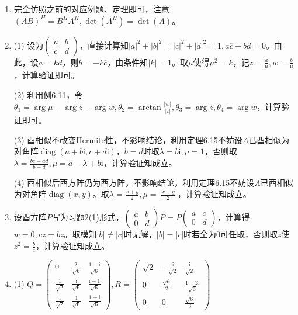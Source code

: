 \documentclass[a4paper,UTF8,fontset=windows]{ctexart}
\DeclareMathOperator{\diag}{diag}
\begin{document}
\begin{enumerate}
\item
完全仿照之前的对应例题、定理即可，注意$(AB)^H=B^HA^H,\det(A^H)=\overline{\det(A)}$。

\item
(1) 设为$\begin{pmatrix}a&b\\c&d\end{pmatrix}$，直接计算知$|a|^2+|b|^2=|c|^2+|d|^2=1,a\overline{c}+b\overline{d}=0$。由此，设$a=k\overline{d}$，则$b=-k\overline{c}$，由条件知$|k|=1$。取$\mu$使得$\mu^2=k$，记$z=\frac{a}{\mu},w=\frac{b}{\mu}$，计算验证即可。

(2)
利用例6.11，令$\theta_1=\arg\mu-\arg z-\arg w,\theta_2=\arctan\frac{|w|}{|z|},\theta_3=\arg z,\theta_4=\arg w$，计算验证即可。

(3) 酉相似不改变Hermite性，不影响结论，利用定理6.15不妨设$A$已酉相似为对角阵$\diag(a+b\mathrm{i},c+d\mathrm{i})$，$b=d$时取$\lambda=b\mathrm{i},\mu=1$，否则取$\lambda=\frac{bc-ad}{b-d},\mu=a-\lambda+b\mathrm{i}$，计算验证知成立。

(4) 酉相似后酉方阵仍为酉方阵，不影响结论，利用定理6.15不妨设$A$已酉相似为对角阵$\diag(x,y)$。取$\lambda=\frac{x+y}{2},\mu=\left|\frac{x-y}{2}\right|$，计算验证知成立。

\item
设酉方阵$P$写为习题2(1)形式，$\begin{pmatrix}a&b\\0&d\end{pmatrix}P=P\begin{pmatrix}a&c\\0&d\end{pmatrix}$，计算得$w=0,cz=b\overline{z}$。取模知$|b|\ne|c|$时无解，$|b|=|c|$时若全为0可任取，否则取$z$使$z^2=\frac{b}{c}$，计算验证知成立。

\item
(1) $Q=\begin{pmatrix}0&\frac{2\mathrm{i}}{\sqrt6}&\frac{1-\mathrm{i}}{\sqrt6}\\[1.5ex]\frac{1}{\sqrt2}&\frac{\mathrm{i}}{\sqrt6}&\frac{\mathrm{i}-1}{\sqrt6}\\[1.5ex]\frac{\mathrm{i}}{\sqrt2}&\frac{1}{\sqrt6}&\frac{1+\mathrm{i}}{\sqrt6}\end{pmatrix},R=\begin{pmatrix}\sqrt2&-\frac{\mathrm{i}}{\sqrt2}&\frac{\mathrm{i}}{\sqrt2}\\[1.5ex]0&\frac{\sqrt6}{2}&\frac{1-2\mathrm{i}}{\sqrt6}\\[1.5ex]0&0&\frac{\sqrt6}{3}\end{pmatrix}$


\end{enumerate}
\end{document}
